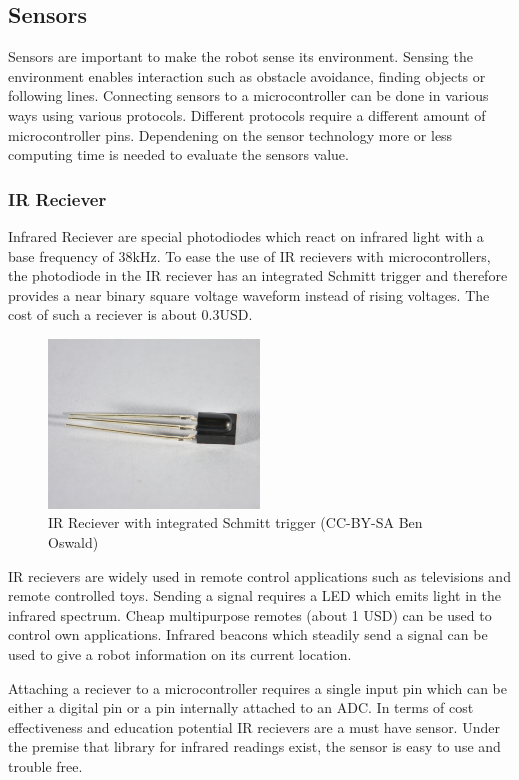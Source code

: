 \documentclass[11pt,a4paper]{article}
\begin{document}
\subsection{Sensors}
Sensors are important to make the robot sense its environment. Sensing the environment enables interaction such as obstacle avoidance, finding objects or following lines. Connecting sensors to a microcontroller can be done in various ways using various protocols. Different protocols require a different amount of microcontroller pins. Dependening on the sensor technology more or less computing time is needed to evaluate the sensors value.  

\subsubsection{IR Reciever}
Infrared Reciever are special photodiodes which react on infrared light with a base frequency of 38kHz. To ease the use of IR recievers with microcontrollers, the photodiode in the IR reciever has an integrated Schmitt trigger and therefore provides a near binary square voltage waveform instead of rising voltages. The cost of such a reciever is about 0.3USD.

\begin{figure}[H]
  \centering
  \includegraphics[width=0.5\textwidth]{images/30_ir.jpg}
  \caption{IR Reciever with integrated Schmitt trigger (CC-BY-SA Ben Oswald)}
\end{figure}

IR recievers are widely used in remote control applications such as televisions and remote controlled toys. Sending a signal requires a LED which emits light in the infrared spectrum. Cheap multipurpose remotes (about 1 USD) can be used to control own applications. Infrared beacons which steadily send a signal can be used to give a robot information on its current location.

Attaching a reciever to a microcontroller requires a single input pin which can be either a digital pin or a pin internally attached to an ADC. In terms of cost effectiveness and education potential IR recievers are a must have sensor. Under the premise that library for infrared readings exist, the sensor is easy to use and trouble free.
\end{document}
